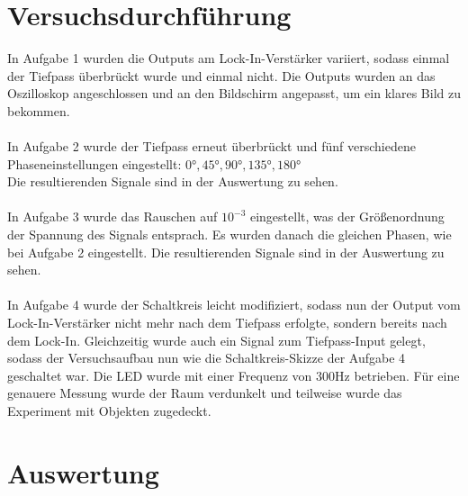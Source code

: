 \documentclass[captions=tableheading]{scrartcl}
\begin{document}
\section{Versuchsdurchführung}
In Aufgabe 1 wurden die Outputs am Lock-In-Verstärker variiert, sodass einmal der Tiefpass überbrückt wurde und einmal nicht.
Die Outputs wurden an das Oszilloskop angeschlossen und an den Bildschirm angepasst, um ein klares Bild zu bekommen.
\\ \\
In Aufgabe 2 wurde der Tiefpass erneut überbrückt und fünf verschiedene Phaseneinstellungen eingestellt: \(0°, 45°, 90°, 135°, 180°\) \\
Die resultierenden Signale sind in der Auswertung zu sehen.
\\ \\
In Aufgabe 3 wurde das Rauschen auf $10^{-3}$ eingestellt, was der Größenordnung der Spannung des Signals entsprach.
Es wurden danach die gleichen Phasen, wie bei Aufgabe 2 eingestellt.
Die resultierenden Signale sind in der Auswertung zu sehen.
\\ \\
In Aufgabe 4 wurde der Schaltkreis leicht modifiziert, sodass nun der Output vom Lock-In-Verstärker nicht mehr nach dem Tiefpass erfolgte, 
sondern bereits nach dem Lock-In. 
Gleichzeitig wurde auch ein Signal zum Tiefpass-Input gelegt, sodass der Versuchsaufbau nun wie die Schaltkreis-Skizze der Aufgabe 4 geschaltet war.
Die LED wurde mit einer Frequenz von 300Hz betrieben. 
Für eine genauere Messung wurde der Raum verdunkelt und teilweise wurde das Experiment mit Objekten zugedeckt.

\section{Auswertung}
\end{document}
